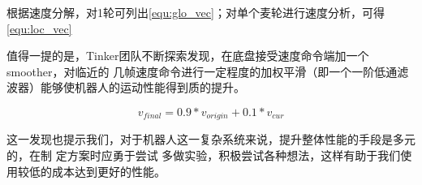 根据速度分解，对1轮可列出\ref{equ:glo_vec}；对单个麦轮进行速度分析，可得\ref{equ:loc_vec}









值得一提的是，Tinker团队不断探索发现，在底盘接受速度命令端加一个smoother，对临近的
几帧速度命令进行一定程度的加权平滑（即一个一阶低通滤波器）能够使机器人的运动性能得到质的提升。

$$ v_{final} = 0.9 * v_{origin} + 0.1 * v_{cur} $$

这一发现也提示我们，对于机器人这一复杂系统来说，提升整体性能的手段是多元的，在制
定方案时应勇于尝试
多做实验，积极尝试各种想法，这样有助于我们使用较低的成本达到更好的性能。

